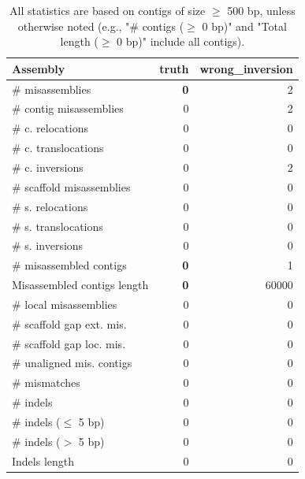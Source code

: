 \documentclass[12pt,a4paper]{article}
\begin{document}
\begin{table}[ht]
\begin{center}
\caption{All statistics are based on contigs of size $\geq$ 500 bp, unless otherwise noted (e.g., "\# contigs ($\geq$ 0 bp)" and "Total length ($\geq$ 0 bp)" include all contigs).}
\begin{tabular}{|l*{2}{|r}|}
\hline
Assembly & truth & wrong\_inversion \\ \hline
\# misassemblies & {\bf 0} & 2 \\ \hline
\hspace{2mm}\# contig misassemblies & 0 & 2 \\ \hline
\hspace{5mm}\# c. relocations & 0 & 0 \\ \hline
\hspace{5mm}\# c. translocations & 0 & 0 \\ \hline
\hspace{5mm}\# c. inversions & 0 & 2 \\ \hline
\hspace{2mm}\# scaffold misassemblies & 0 & 0 \\ \hline
\hspace{5mm}\# s. relocations & 0 & 0 \\ \hline
\hspace{5mm}\# s. translocations & 0 & 0 \\ \hline
\hspace{5mm}\# s. inversions & 0 & 0 \\ \hline
\# misassembled contigs & {\bf 0} & 1 \\ \hline
Misassembled contigs length & {\bf 0} & 60000 \\ \hline
\# local misassemblies & 0 & 0 \\ \hline
\# scaffold gap ext. mis. & 0 & 0 \\ \hline
\# scaffold gap loc. mis. & 0 & 0 \\ \hline
\# unaligned mis. contigs & 0 & 0 \\ \hline
\# mismatches & 0 & 0 \\ \hline
\# indels & 0 & 0 \\ \hline
\hspace{5mm}\# indels ($\leq$ 5 bp) & 0 & 0 \\ \hline
\hspace{5mm}\# indels ($>$ 5 bp) & 0 & 0 \\ \hline
Indels length & 0 & 0 \\ \hline
\end{tabular}
\end{center}
\end{table}
\end{document}
